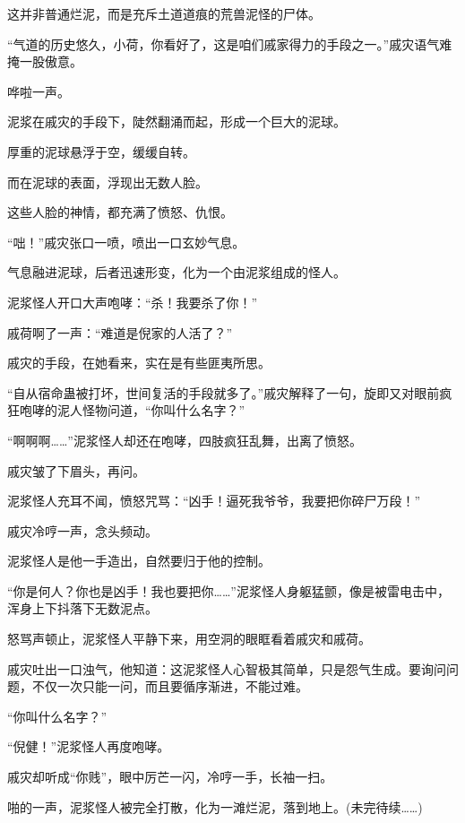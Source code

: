 \begin{this_body}
这并非普通烂泥，而是充斥土道道痕的荒兽泥怪的尸体。

“气道的历史悠久，小荷，你看好了，这是咱们戚家得力的手段之一。”戚灾语气难掩一股傲意。

哗啦一声。

泥浆在戚灾的手段下，陡然翻涌而起，形成一个巨大的泥球。

厚重的泥球悬浮于空，缓缓自转。

而在泥球的表面，浮现出无数人脸。

这些人脸的神情，都充满了愤怒、仇恨。

“咄！”戚灾张口一喷，喷出一口玄妙气息。

气息融进泥球，后者迅速形变，化为一个由泥浆组成的怪人。

泥浆怪人开口大声咆哮：“杀！我要杀了你！”

戚荷啊了一声：“难道是倪家的人活了？”

戚灾的手段，在她看来，实在是有些匪夷所思。

“自从宿命蛊被打坏，世间复活的手段就多了。”戚灾解释了一句，旋即又对眼前疯狂咆哮的泥人怪物问道，“你叫什么名字？”

“啊啊啊……”泥浆怪人却还在咆哮，四肢疯狂乱舞，出离了愤怒。

戚灾皱了下眉头，再问。

泥浆怪人充耳不闻，愤怒咒骂：“凶手！逼死我爷爷，我要把你碎尸万段！”

戚灾冷哼一声，念头频动。

泥浆怪人是他一手造出，自然要归于他的控制。

“你是何人？你也是凶手！我也要把你……”泥浆怪人身躯猛颤，像是被雷电击中，浑身上下抖落下无数泥点。

怒骂声顿止，泥浆怪人平静下来，用空洞的眼眶看着戚灾和戚荷。

戚灾吐出一口浊气，他知道：这泥浆怪人心智极其简单，只是怨气生成。要询问问题，不仅一次只能一问，而且要循序渐进，不能过难。

“你叫什么名字？”

“倪健！”泥浆怪人再度咆哮。

戚灾却听成“你贱”，眼中厉芒一闪，冷哼一手，长袖一扫。

啪的一声，泥浆怪人被完全打散，化为一滩烂泥，落到地上。(未完待续……)

\end{this_body}

